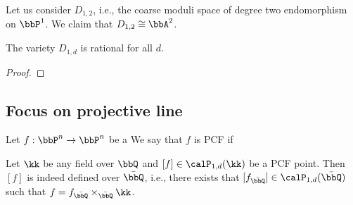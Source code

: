 \begin{example}[label=\labelNFM{eg:moduli-of-degree-two-maps-on-p1}, status=draft, tag=0000000]
	Let us consider $D_{1,2}$, i.e., the coarse moduli space of degree two endomorphism on $\bbP^1$.
	We claim that $D_{1,2} \cong \bbA^2$.
\end{example}

\begin{theorem}[label=\labelNFM{thm:coarse-moduli-of-dynamics-on-projective-line-is-rational}, status=draft, tag=0000000]
	The variety $D_{1,d}$ is rational for all $d$.
\end{theorem}
\begin{proof}
	\Yang{}
\end{proof}




\subsection[status=draft,tag=0000000,label=\labelNFM{subsec:focus-on-projective-lines}]{Focus on projective line}

\begin{definition}[label=\labelNFM{def:pcf-map-on-pn}, status=draft, tag=0000000]
	Let $f: \bbP^n \to \bbP^n$ be a \Yang{}
	We say that $f$ is PCF if \Yang{}
\end{definition}

\begin{theorem}[label=\labelNFM{thm:pcf-points-defined-over-Qbar}, status=draft, tag=0000000]
	Let $\kk$ be any field over $\bbQ$ and $[f] \in \calP_{1,d}(\kk)$ be a PCF point.
	Then $[f]$ is indeed defined over $\bar{\bbQ}$, i.e., there exists that $[f_{\bar{\bbQ}}] \in \calP_{1,d}(\bar{\bbQ})$ such that $f = f_{\bar{\bbQ}} \times_{\bar{\bbQ}} \kk$.
	\Yang{}
\end{theorem}










